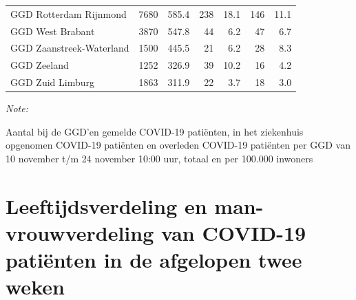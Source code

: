 \documentclass[
  english,
  man,floatsintext]{apa6}
\begin{document}
\begin{table}[H]
\begin{threeparttable}
\begin{tabular}{lrrrrrr}
GGD Rotterdam Rijnmond & 7680 & 585.4 & 238 & 18.1 & 146 & 11.1\\
GGD West Brabant & 3870 & 547.8 & 44 & 6.2 & 47 & 6.7\\
GGD Zaanstreek-Waterland & 1500 & 445.5 & 21 & 6.2 & 28 & 8.3\\
GGD Zeeland & 1252 & 326.9 & 39 & 10.2 & 16 & 4.2\\
GGD Zuid Limburg & 1863 & 311.9 & 22 & 3.7 & 18 & 3.0\\
\bottomrule
\end{tabular}
\begin{tablenotes}
\item \textit{Note: } 
\item Aantal bij de GGD’en gemelde COVID-19 patiënten, in het ziekenhuis opgenomen COVID-19 patiënten en overleden COVID-19 patiënten per GGD van 10 november t/m 24 november 10:00 uur, totaal en per 100.000 inwoners
\end{tablenotes}
\end{threeparttable}
\endgroup{}
\end{table}

\newpage

\hypertarget{leeftijdsverdeling-en-man-vrouwverdeling-van-covid-19-patiuxebnten-in-de-afgelopen-twee-weken}{%
\section{Leeftijdsverdeling en man-vrouwverdeling van COVID-19 patiënten in de afgelopen twee weken}\label{leeftijdsverdeling-en-man-vrouwverdeling-van-covid-19-patiuxebnten-in-de-afgelopen-twee-weken}}
\end{document}
